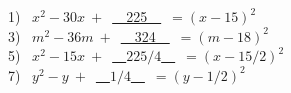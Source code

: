 \documentclass[11pt]{book}
\newcommand{\tmstrong}[1]{\textbf{#1}}
\theoremstyle{definition}  %
\begin{document}

\begin{multicols}{2}
  1)~ $x^2 - 30 x~+$~\underline{~~225~~}~$=(x-15)^2$\\
  3)~ $m^2 - 36 m~+$~\underline{~~324~~}~$=(m-18)^2$\\
  5)~ $x^2 - 15 x~+$~\underline{~~$225/4$~~}~$=(x-15/2)^2$\\
  7)~ $y^2 - y~+$~\underline{~~$1/4$~~}~$=(y-1/2)^2$%
\end{multicols}

\end{document}
